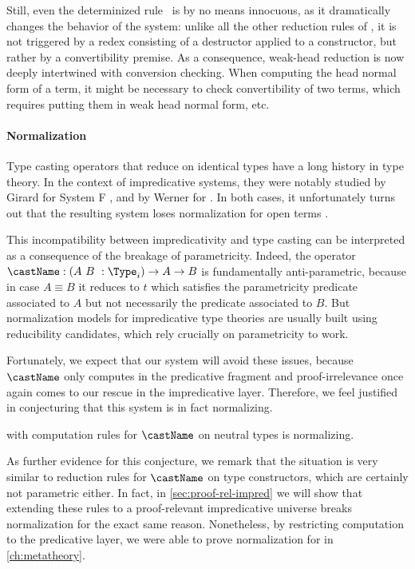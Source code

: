 Still, even the determinized rule~ is by no 
means innocuous, as it dramatically changes the behavior of the system: 
% 
unlike all the other reduction rules of \SetoidCCplus, it is not triggered by 
a redex consisting of a destructor applied to a constructor, but rather by a 
convertibility premise.
% 
As a consequence, weak-head reduction is now deeply intertwined with conversion
checking. When computing the head normal form of a term, it might be necessary
to check convertibility of two terms, which requires putting them in weak head 
normal form, etc.

\paragraph*{Normalization}

Type casting operators that reduce on identical types have a long history in
type theory. 
% 
In the context of impredicative systems, they were notably studied by Girard 
for System F , and by Werner for \CIC {}.
% 
In both cases, it unfortunately turns out that the resulting system loses 
normalization for open terms .

This incompatibility between impredicativity and type casting can be 
interpreted as a consequence of the breakage of parametricity.
%
Indeed, the operator \( {\castName : (A\ B\ : \Type_i) \to A \to B} \) 
is fundamentally anti-parametric, because in case \( A \equiv B \) it
reduces to \( t \) which satisfies the parametricity predicate associated 
to \( A \) but not necessarily the predicate associated to \( B \).
% 
But normalization models for impredicative type theories are usually built
using reducibility candidates, which rely crucially on parametricity to 
work.

Fortunately, we expect that our system \SetoidCCplus will avoid these issues, 
because \( \castName \) only computes in the predicative fragment and 
proof-irrelevance once again comes to our rescue in the impredicative 
layer.
% 
Therefore, we feel justified in conjecturing that this system is in fact 
normalizing.
% 
\begin{conjecture}
  \SetoidCCplus with computation rules for \( \castName \) on neutral types is 
  normalizing.
\end{conjecture}

As further evidence for this conjecture, we remark that the situation is very 
similar to reduction rules for \( \castName \) on type constructors, 
which are certainly not parametric either.
% 
In fact, in \cref{sec:proof-rel-impred} we will show that extending these rules 
to a proof-relevant impredicative universe breaks normalization for the exact 
same reason.
% 
Nonetheless, by restricting computation to the predicative layer, we were able 
to prove normalization for \SetoidCC in \cref{ch:metatheory}. 

